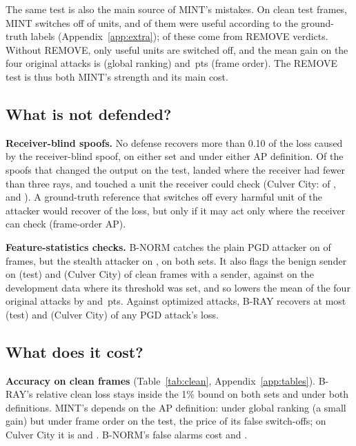 \documentclass[conference]{IEEEtran}
\newcommand{\mint}{MINT}
\newcommand{\pts}{\,pts}
\begin{document}
The same test is also the main source of \mint's mistakes. On clean test frames, \mint{} switches off
\MintCleanGated{} of \MintCleanUnits{} units, and \MintCleanFalseSwitch{} of them were useful according to the
ground-truth labels (Appendix~\ref{app:extra}); \MintCleanFalseSwitchRemove{} of these come from REMOVE verdicts.
Without REMOVE, only \MintNoRemCleanFalseSwitch{} useful units are switched off, and the mean gain on the four
original attacks is \HeadGlobMINTNoRem{} (global ranking) and \HeadFrameMINTNoRem\pts{} (frame order). The REMOVE
test is thus both \mint's strength and its main cost.

\subsection{What is not defended?}
\label{sec:limits}
\textbf{Receiver-blind spoofs.} No defense recovers more than 0.10 of the loss caused by the receiver-blind spoof,
on either set and under either AP definition. Of the \RealizedSpoofBlind{} spoofs that changed the output on the
test, \BlindRealizedLowRay{} landed where the receiver had fewer than three rays, and \BlindRealizedKnownHit{}
touched a unit the receiver could check (Culver City: \CulBlindRealizedLowRay{} of \CulRealizedSpoofBlind, and
\CulBlindRealizedKnownHit). A ground-truth reference that switches off every harmful unit of the attacker would
recover \OracleRecSpoofBlind{} of the loss, but only \VisOracleRecSpoofBlind{} if it may act only where the
receiver can check (frame-order AP).

\textbf{Feature-statistics checks.} B-NORM catches the plain PGD attacker on \CatchPgdUnt{} of frames, but the
stealth attacker on \CatchPgdUntSt, on both sets. It also flags the benign sender on \CatchClean{} (test) and
\CulCatchClean{} (Culver City) of clean frames with a sender, against \BnormFalseFlagH{} on the development data
where its threshold was set, and so lowers the mean of the four original attacks by \HeadGlobBNORM{} and
\CulHeadGlobBNORM\pts. Against optimized attacks, B-RAY recovers at most \RecFramePgdUntStStrongBRAY{} (test) and
\CulRecFramePgdUntBRAY{} (Culver City) of any PGD attack's loss.

\subsection{What does it cost?}
\label{sec:costs}
\textbf{Accuracy on clean frames} (Table~\ref{tab:clean}, Appendix~\ref{app:tables}). B-RAY's relative clean
loss stays inside the 1\% bound on both sets and under both definitions. \mint's depends on the AP definition:
\CleanGlobMINT{} under global ranking (a small gain) but \CleanFrameMINT{} under frame order on the test, the
price of its false switch-offs; on Culver City it is \CulCleanGlobMINT{} and \CulCleanFrameMINT. B-NORM's false
alarms cost \CleanGlobBNORM{} and \CulCleanGlobBNORM.
\end{document}
